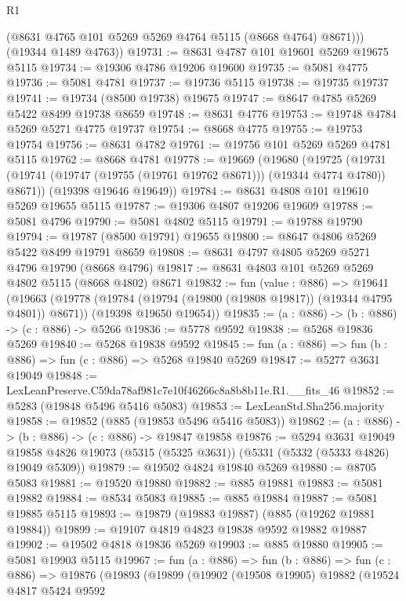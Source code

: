 \begin{lexlean}{R1}
\begin{coremodule}
          (@8631 @4765 @101 @5269 @5269 @4764 @5115 (@8668 @4764) @8671)))
      (@19344 @1489 @4763))
@19731 := @8631 @4787 @101 @19601 @5269 @19675 @5115
@19734 := @19306 @4786 @19206 @19600
@19735 := @5081 @4775
@19736 := @5081 @4781
@19737 := @19736 @5115
@19738 := @19735 @19737
@19741 := @19734 (@8500 @19738) @19675
@19747 := @8647 @4785 @5269 @5422 @8499 @19738 @8659
@19748 := @8631 @4776
@19753 := @19748 @4784 @5269 @5271 @4775 @19737
@19754 := @8668 @4775
@19755 := @19753 @19754
@19756 := @8631 @4782
@19761 := @19756 @101 @5269 @5269 @4781 @5115
@19762 := @8668 @4781
@19778 := @19669
    (@19680
      (@19725 (@19731 (@19741 (@19747 (@19755 (@19761 @19762 @8671))) (@19344 @4774 @4780)) @8671))
      (@19398 @19646 @19649))
@19784 := @8631 @4808 @101 @19610 @5269 @19655 @5115
@19787 := @19306 @4807 @19206 @19609
@19788 := @5081 @4796
@19790 := @5081 @4802 @5115
@19791 := @19788 @19790
@19794 := @19787 (@8500 @19791) @19655
@19800 := @8647 @4806 @5269 @5422 @8499 @19791 @8659
@19808 := @8631 @4797 @4805 @5269 @5271 @4796 @19790 (@8668 @4796)
@19817 := @8631 @4803 @101 @5269 @5269 @4802 @5115 (@8668 @4802) @8671
@19832 := fun (value : @886) =>
  @19641
    (@19663
      (@19778 (@19784 (@19794 (@19800 (@19808 @19817)) (@19344 @4795 @4801)) @8671))
      (@19398 @19650 @19654))
@19835 := (a : @886) -> (b : @886) -> (c : @886) -> @5266
@19836 := @5778 @9592
@19838 := @5268 @19836 @5269
@19840 := @5268 @19838 @9592
@19845 := fun (a : @886) => fun (b : @886) => fun (c : @886) => @5268 @19840 @5269
@19847 := @5277 @3631 @19049
@19848 := LexLeanPreserve.C59da78af981c7e10f46266c8a8b8b11e.R1.__fits_46
@19852 := @5283 (@19848 @5496 @5416 @5083)
@19853 := LexLeanStd.Sha256.majority
@19858 := @19852 (@885 (@19853 @5496 @5416 @5083))
@19862 := (a : @886) -> (b : @886) -> (c : @886) -> @19847 @19858
@19876 := @5294
    @3631
    @19049
    @19858
    @4826
    @19073
    (@5315 (@5325 @3631))
    (@5331 (@5332 (@5333 @4826) @19049 @5309))
@19879 := @19502 @4824 @19840 @5269
@19880 := @8705 @5083
@19881 := @19520 @19880
@19882 := @885 @19881
@19883 := @5081 @19882
@19884 := @8534 @5083
@19885 := @885 @19884
@19887 := @5081 @19885 @5115
@19893 := @19879 (@19883 @19887) (@885 (@19262 @19881 @19884))
@19899 := @19107 @4819 @4823 @19838 @9592 @19882 @19887
@19902 := @19502 @4818 @19836 @5269
@19903 := @885 @19880
@19905 := @5081 @19903 @5115
@19967 := fun (a : @886) =>
  fun (b : @886) =>
  fun (c : @886) =>
  @19876
    (@19893
      (@19899
        (@19902
          (@19508 @19905)
          @19882
          (@19524
            @4817
            @5424
            @9592

\end{coremodule}
\end{lexlean}
